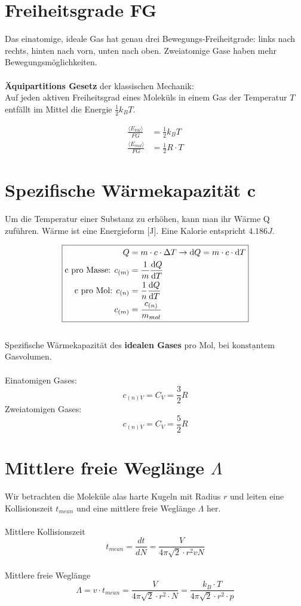\section{Freiheitsgrade FG}
Das einatomige, ideale Gas hat genau drei Bewegungs-Freiheitgrade: links nach rechts, hinten nach vorn, unten nach oben. Zweiatomige Gase haben mehr Bewegungsmöglichkeiten.\\
\\
\textbf{Äquipartitions Gesetz} der klassischen Mechanik:\\ 
Auf jeden aktiven Freiheitsgrad eines Moleküls in einem Gas der Temperatur $T$ entfällt im Mittel die Energie $\frac{1}{2}k_{B}T$.

\[\boxed{\begin{aligned}
		\frac{\langle E_{kül} \rangle}{FG}&= \frac{1}{2}k_{B}T
		\\
		\frac{\langle E_{mol} \rangle}{FG}&= \frac{1}{2}R \cdot T
	\end{aligned}}\]	

\section{Spezifische Wärmekapazität c}
Um die Temperatur einer Substanz zu erhöhen, kann man ihr Wärme Q zuführen. Wärme ist eine Energieform [J]. Eine Kalorie entspricht $4.186J$.


\[\boxed{
	\begin{aligned}
		Q&=m \cdot c \cdot \Delta T \rightarrow \mathrm{d} Q=m \cdot c \cdot \mathrm{d} T
		\\
		\text{c pro Masse: }c_{(m)}&=\frac{1}{m} \frac{\mathrm{d} Q}{\mathrm{d} T}
		\\
		\text{c pro Mol: }c_{(n)}&=\frac{1}{n} \frac{\mathrm{d} Q}{\mathrm{d} T}		
		\\
		c_{(m)}&=\frac{c_{(n)}}{m_{mol}}
	\end{aligned}	
	}\]	
\\	
Spezifische Wärmekapazität des \textbf{idealen Gases} pro Mol, bei $\underline{\mathrm{konstantem}}$ Gasvolumen.
\\
\\		Einatomigen Gases:
		\[\boxed{			
			c_{(n)V}=C_{V}=\frac{3}{2}R
		}\]\newline
		Zweiatomigen Gases:
		\[\boxed{	
			c_{(n)V}=C_{V}=\frac{5}{2}R							
		}\]\newline

\section{Mittlere freie Weglänge $\Lambda$}
Wir betrachten die Moleküle alas harte Kugeln mit Radius $r$ und leiten eine Kollisionszeit $t_{mean}$ und eine mittlere freie Weglänge $\Lambda$ her.\\
\\
Mittlere Kollisionszeit
\[ t_{mean} = \frac{dt}{dN}= \frac{V}{4 \pi \sqrt{2} \cdot r^2vN} \]
\\	
Mittlere freie Wegl\"ange
\[ \Lambda =v \cdot t_{mean}= \frac{V}{4 \pi \sqrt{2} \cdot r^2 \cdot N}=  \frac{k_{B} \cdot T}{4 \pi \sqrt{2} \cdot r^2 \cdot p} \]

